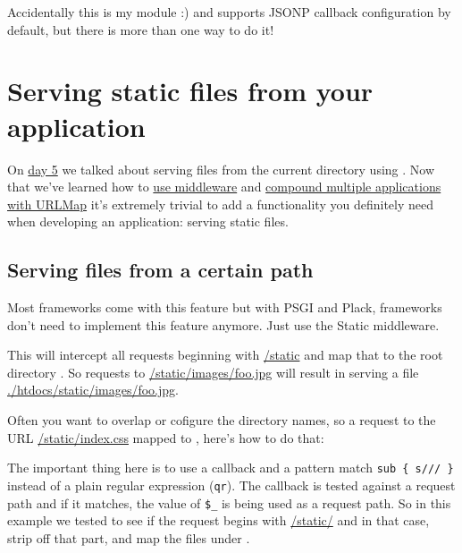 
Accidentally this
\href{http://search.cpan.org/perldoc?Catalyst::View::JSON}{}
is my module :) and supports JSONP callback configuration by default,
but there is more than one way to do it!

\chapter{Serving static files from your
application}\label{day-17-serving-static-files-from-your-application}

On
\href{http://advent.plackperl.org/2009/12/day-5-run-a-static-file-web-server-with-plack.html}{day
5} we talked about serving files from the current directory using
. Now that we've learned how to
\href{http://advent.plackperl.org/2009/12/day-10-using-plack-middleware.html}{use
middleware} and
\href{http://advent.plackperl.org/2009/12/day-12-maps-multiple-apps-with-mount-and-urlmap.html}{compound
multiple applications with URLMap} it's extremely trivial to add a
functionality you definitely need when developing an application:
serving static files.

\section{Serving files from a certain
path}\label{serving-files-from-a-certain-path}

Most frameworks come with this feature but with PSGI and Plack,
frameworks don't need to implement this feature anymore. Just use the
Static middleware.


This will intercept all requests beginning with \url{/static} and map that
to the root directory . So requests to
\url{/static/images/foo.jpg} will result in serving a file
\url{./htdocs/static/images/foo.jpg}.

Often you want to overlap or cofigure the directory names, so a request
to the URL \url{/static/index.css} mapped to ,
here's how to do that:


The important thing here is to use a callback and a pattern match
\lstinline!sub { s/// }! instead of a plain regular expression
(\lstinline!qr!). The callback is tested against a request path and if
it matches, the value of \lstinline!$_! is being used as a request path.
So in this example we tested to see if the request begins with
\url{/static/} and in that case, strip off that part, and map the files
under .


